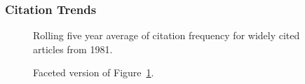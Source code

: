 \documentclass[
  10pt,
  letterpaper,
  DIV=11,
  numbers=noendperiod,
  twoside]{scrartcl}
\begin{document}
\subsubsection*{Citation Trends}\label{sec-trends-1981}

\begin{figure}


\caption{\label{fig-citation-spaghetti-1981}Rolling five year average of
citation frequency for widely cited articles from 1981.}

\end{figure}%

\begin{figure}


\caption{\label{fig-citation-facet-1981}Faceted version of
Figure~\ref{fig-citation-spaghetti-1981}.}

\end{figure}%
\end{document}
